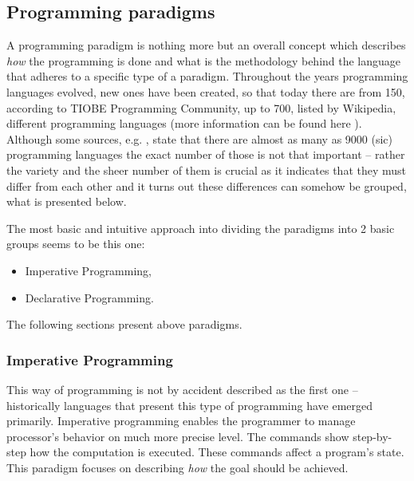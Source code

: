    \subsection{Programming paradigms}
        A programming paradigm is nothing more but an overall concept which describes \textit{how} the programming is done and what is the methodology behind the language that adheres to a specific type of a paradigm. Throughout the years programming languages evolved, new ones have been created, so that today there are from 150, according to TIOBE Programming Community, up to 700, listed by Wikipedia, different programming languages (more information can be found here \cite{numberOfProgrammingLanguages}). Although some sources, e.g. \cite{numberOfProgrammingLanguages_hopl_info}, state that there are almost as many as 9000 (sic) programming languages the exact number of those is not that important -- rather the variety and the sheer number of them is crucial as it indicates that they must differ from each other and it turns out these differences can somehow be grouped, what is presented below.
        
        The most basic and intuitive approach into dividing the paradigms into 2 basic groups seems to be this one:
        \begin{itemize}
            \item Imperative Programming,
            \item Declarative Programming.
        \end{itemize}
        The following sections present above paradigms.
    
    \subsubsection{Imperative Programming}
        This way of programming is not by accident described as the first one -- historically languages that present this type of programming have emerged primarily. Imperative programming enables the programmer to manage processor's behavior on much more precise level. The commands show step-by-step how the computation is executed. These commands affect a program's state. This paradigm focuses on describing \textit{how} the goal should be achieved.
        
